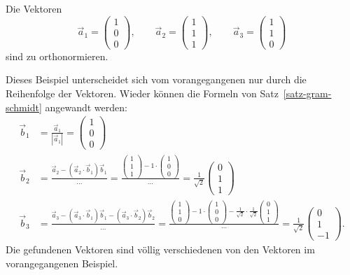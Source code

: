 \begin{beispiel}
Die Vektoren
\[
\vec a_1=\begin{pmatrix}1\\0\\0\end{pmatrix},\qquad
\vec a_2=\begin{pmatrix}1\\1\\1\end{pmatrix},\qquad
\vec a_3=\begin{pmatrix}1\\1\\0\end{pmatrix}
\]
sind zu orthonormieren.

Dieses Beispiel unterscheidet sich vom vorangegangenen nur
durch die Reihenfolge der Vektoren.
Wieder können die Formeln von Satz~\ref{satz-gram-schmidt} angewandt werden:
\begin{align*}
\vec b_1&=\frac{\vec a_1}{|\vec a_1|}=\begin{pmatrix}1\\0\\0\end{pmatrix}
\\
\vec b_2
&=
\frac{\vec a_2-(\vec a_2\cdot \vec b_1)\vec b_1}{\dots}
=
\frac{\begin{pmatrix}1\\1\\1\end{pmatrix}-1\cdot\begin{pmatrix}1\\0\\0\end{pmatrix}}{\dots}=\frac1{\sqrt{2}}\begin{pmatrix}0\\1\\1\end{pmatrix}
\\
\vec b_3
&=
\frac{\vec a_3-(\vec a_3\cdot\vec b_1)\vec b_1-(\vec a_3\cdot\vec b_2)\vec b_2}{\dots}
=\frac{\displaystyle\begin{pmatrix}1\\1\\0\end{pmatrix}-1\cdot\begin{pmatrix}1\\0\\0\end{pmatrix}-\frac1{\sqrt{2}}\cdot\frac1{\sqrt{2}}\begin{pmatrix}0\\1\\1\end{pmatrix} }{\cdots}
=\frac{1}{\sqrt{2}}\begin{pmatrix}0\\1\\-1\end{pmatrix}.
\end{align*}
Die gefundenen Vektoren sind völlig verschiedenen von den Vektoren
im vorangegangenen Beispiel.
\end{beispiel}


